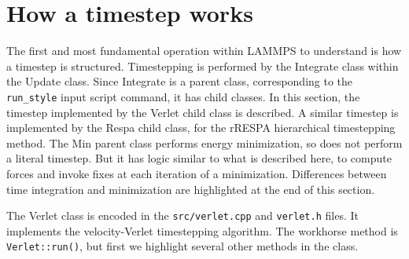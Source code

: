\documentclass{article}
\newcommand{\path}[1]{{\color{gray}\texttt{#1}}}
\newcommand{\code}[1]{{\color{cadetblue}\texttt{#1}}}
\begin{document}

\pagebreak
\section{How a timestep works}

The first and most fundamental operation within LAMMPS to understand
is how a timestep is structured.  Timestepping is performed by the
Integrate class within the Update class.  Since Integrate is a parent
class, corresponding to the \code{run\_style} input script command, it has
child classes.  In this section, the timestep implemented by the
Verlet child class is described.  A similar timestep is implemented by
the Respa child class, for the rRESPA hierarchical timestepping
method.  The Min parent class performs energy minimization, so does
not perform a literal timestep.  But it has logic similar to what is
described here, to compute forces and invoke fixes at each iteration
of a minimization.  Differences between time integration and
minimization are highlighted at the end of this section.

The Verlet class is encoded in the \path{src/verlet.cpp} and \path{verlet.h} files.
It implements the velocity-Verlet timestepping algorithm.  The
workhorse method is \code{Verlet::run()}, but first we highlight several
other methods in the class.
\end{document}
